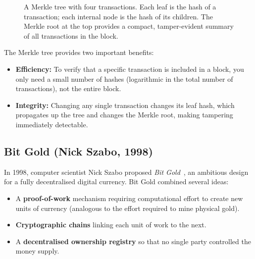 \begin{figure}[htbp]
\centering
{}
\caption{A Merkle tree with four transactions. Each leaf is the hash of a transaction; each internal node is the hash of its children. The Merkle root at the top provides a compact, tamper-evident summary of all transactions in the block.}
\label{fig:merkle-tree}
\end{figure}

The Merkle tree provides two important benefits:
\begin{itemize}
    \item \textbf{Efficiency:} To verify that a specific transaction is included in a block, you only need a small number of hashes (logarithmic in the total number of transactions), not the entire block.
    \item \textbf{Integrity:} Changing any single transaction changes its leaf hash, which propagates up the tree and changes the Merkle root, making tampering immediately detectable.
\end{itemize}

\subsection{Bit Gold (Nick Szabo, 1998)}

In 1998, computer scientist Nick Szabo proposed \emph{Bit Gold}~\cite{szabo1998bitgold}, an ambitious design for a fully decentralised digital currency. Bit Gold combined several ideas:
\begin{itemize}
    \item A \textbf{proof-of-work} mechanism requiring computational effort to create new units of currency (analogous to the effort required to mine physical gold).
    \item \textbf{Cryptographic chains} linking each unit of work to the next.
    \item A \textbf{decentralised ownership registry} so that no single party controlled the money supply.
\end{itemize}

